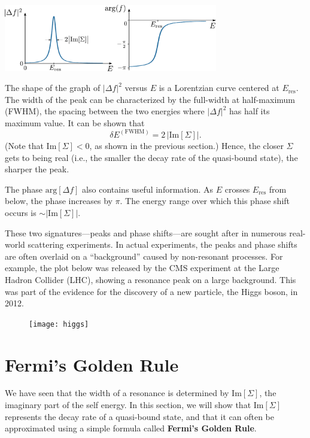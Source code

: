 \documentclass[pra,12pt]{revtex4}
\begin{document}
\begin{center}
  \includegraphics[width=0.7\textwidth]{resonance}  
\end{center}

\noindent
The shape of the graph of $|\Delta f|^2$ versus $E$ is a Lorentzian
curve centered at $E_{\mathrm{res}}$.  The width of the peak can be
characterized by the full-width at half-maximum (FWHM), the spacing
between the two energies where $|\Delta f|^2$ has half its maximum
value.  It can be shown that
\begin{equation}
  \delta E^{(\mathrm{FWHM})} = 2\, \big|\mathrm{Im}[\Sigma]\big|.
\end{equation}
(Note that $\mathrm{Im}[\Sigma] < 0$, as shown in the previous
section.)  Hence, the closer $\Sigma$ gets to being real (i.e., the
smaller the decay rate of the quasi-bound state), the sharper the
peak.

The phase $\mathrm{arg}[\Delta f]$ also contains useful information.
As $E$ crosses $E_{\mathrm{res}}$ from below, the phase increases by
$\pi$.  The energy range over which this phase shift occurs is $\sim
|\mathrm{Im}[\Sigma]|$.

These two signatures---peaks and phase shifts---are sought after in
numerous real-world scattering experiments.  In actual experiments,
the peaks and phase shifts are often overlaid on a ``background''
caused by non-resonant processes.  For example, the plot below was
released by the CMS experiment at the Large Hadron Collider (LHC),
showing a resonance peak on a large background.  This was part of the
evidence for the discovery of a new particle, the Higgs boson, in
2012.

\begin{figure}[h]
  \centering\texttt{[image: higgs]}
\end{figure}

\section{Fermi's Golden Rule}
\label{sec:goldenrule}

We have seen that the width of a resonance is determined by
$\mathrm{Im}[\Sigma]$, the imaginary part of the self energy.  In this
section, we will show that $\mathrm{Im}[\Sigma]$ represents the decay
rate of a quasi-bound state, and that it can often be approximated
using a simple formula called \textbf{Fermi's Golden Rule}.
\end{document}
